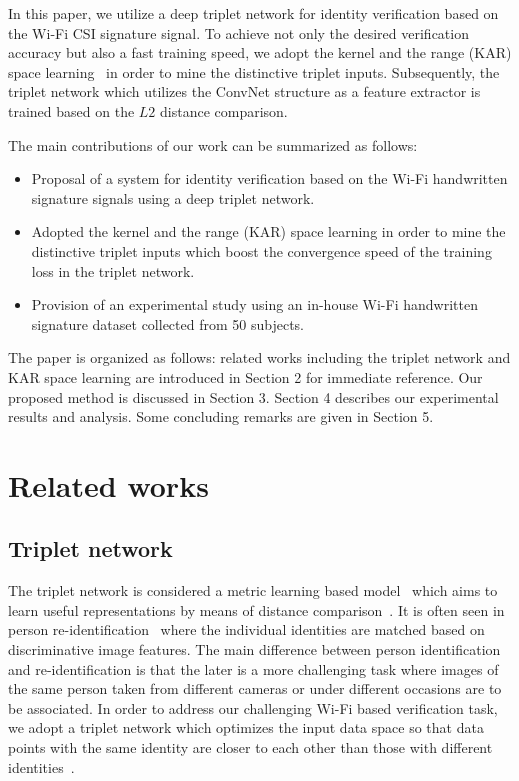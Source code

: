\documentclass[sigconf]{acmart}
\begin{document}
In this paper, we utilize a deep triplet network for identity verification based on the Wi-Fi CSI signature signal. To achieve not only the desired verification accuracy but also a fast training speed, we adopt the kernel and the range (KAR) space learning~\cite{toh100,toh2018learning,toh2018analytic,toh2018gradient} in order to mine the distinctive triplet inputs. Subsequently, the triplet network which utilizes the ConvNet structure as a feature extractor is trained based on the $L2$ distance comparison.

The main contributions of our work can be summarized as follows:
\begin{itemize}
\item Proposal of a system for identity verification based on the Wi-Fi handwritten signature signals using a deep triplet network.
\item Adopted the kernel and the range (KAR) space learning in order to mine the distinctive triplet inputs which boost the convergence speed of the training loss in the triplet network.
\item Provision of an experimental study using an in-house Wi-Fi handwritten signature dataset collected from 50 subjects.
\end{itemize}

The paper is organized as follows: related works including the triplet network and KAR space learning are introduced in Section 2 for immediate reference. Our proposed method is discussed in Section 3. Section 4 describes our experimental results and analysis. Some concluding remarks are given in Section 5.

\section{Related works}
\subsection{Triplet network}
The triplet network is considered a metric learning based model~\cite{weinberger2006distance} which aims to learn useful representations by means of distance comparison~\cite{hoffer2015deep}. 
It is often seen in person re-identification~\cite{chen2017beyond,cheng2016person,ding2015deep,schroff2015facenet,wang2016joint} where the individual identities are matched based on discriminative image features. The main difference between person identification and re-identification is that the later is a more challenging task where images of the same person taken from different cameras or under different occasions are to be associated. In order to address our challenging Wi-Fi based verification task, we adopt a triplet network which optimizes the input data space so that data points with the same identity are closer to each other than those with different identities~\cite{hermans2017defense}.
\end{document}
